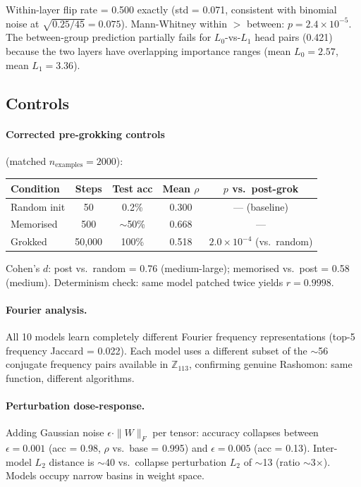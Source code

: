 \documentclass[11pt]{article}
\begin{document}
Within-layer flip rate = 0.500 exactly (std = 0.071, consistent with binomial noise at $\sqrt{0.25/45} = 0.075$). Mann-Whitney within $>$ between: $p = 2.4 \times 10^{-5}$. The between-group prediction partially fails for $L_0$-vs-$L_1$ head pairs (0.421) because the two layers have overlapping importance ranges (mean $L_0 = 2.57$, mean $L_1 = 3.36$).

\subsection{Controls}

\paragraph{Corrected pre-grokking controls} (matched $n_{\mathrm{examples}} = 2000$):

\begin{center}
\begin{tabular}{lcccc}
\toprule
Condition & Steps & Test acc & Mean $\rho$ & $p$ vs.\ post-grok \\
\midrule
Random init & 50 & 0.2\% & 0.300 & --- (baseline) \\
Memorised & 500 & $\sim$50\% & 0.668 & --- \\
Grokked & 50,000 & 100\% & 0.518 & $2.0 \times 10^{-4}$ (vs.\ random) \\
\bottomrule
\end{tabular}
\end{center}

Cohen's $d$: post vs.\ random = 0.76 (medium-large); memorised vs.\ post = 0.58 (medium). Determinism check: same model patched twice yields $r = 0.9998$.

\paragraph{Fourier analysis.} All 10 models learn completely different Fourier frequency representations (top-5 frequency Jaccard = 0.022). Each model uses a different subset of the $\sim$56 conjugate frequency pairs available in $\mathbb{Z}_{113}$, confirming genuine Rashomon: same function, different algorithms.

\paragraph{Perturbation dose-response.} Adding Gaussian noise $\epsilon \cdot \|W\|_F$ per tensor: accuracy collapses between $\epsilon = 0.001$ (acc = 0.98, $\rho$ vs.\ base = 0.995) and $\epsilon = 0.005$ (acc = 0.13). Inter-model $L_2$ distance is $\sim$40 vs.\ collapse perturbation $L_2$ of $\sim$13 (ratio $\sim$3$\times$). Models occupy narrow basins in weight space.
\end{document}
